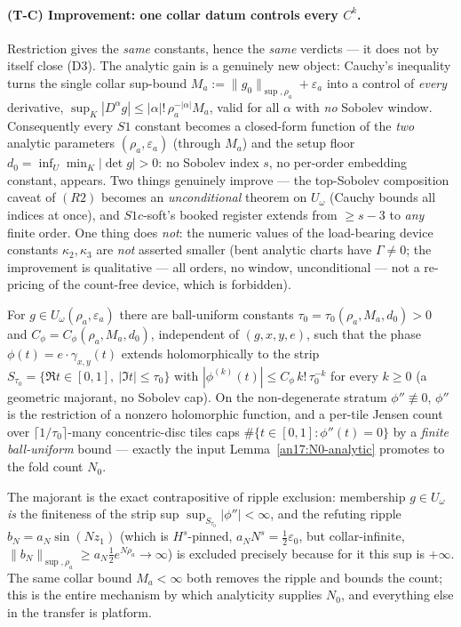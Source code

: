 \paragraph{(T-C) Improvement: one collar datum controls every $C^k$.} Restriction
gives the \emph{same} constants, hence the \emph{same} verdicts --- it does not by
itself close (D3). The analytic gain is a genuinely new object: Cauchy's
inequality turns the single collar sup-bound $M_a:=\|g_0\|_{\sup,\rho_a}+
\varepsilon_a$ into a control of \emph{every} derivative, $\sup_{K}|D^\alpha g|
\le|\alpha|!\,\rho_a^{-|\alpha|}M_a$, valid for all $\alpha$ with \emph{no}
Sobolev window. Consequently every $S1$ constant becomes a closed-form function of
the \emph{two} analytic parameters $(\rho_a,\varepsilon_a)$ (through $M_a$) and the
setup floor $d_0=\inf_U\min_K|\det g|>0$: no Sobolev index $s$, no per-order
embedding constant, appears. Two things genuinely improve --- the top-Sobolev
composition caveat of $(R2)$ becomes an \emph{unconditional} theorem on $U_\omega$
(Cauchy bounds all indices at once), and $S1c$-soft's booked register extends from
$\ge s-3$ to \emph{any} finite order. One thing does \emph{not}: the numeric
values of the load-bearing device constants $\kappa_2,\kappa_3$ are \emph{not}
asserted smaller (bent analytic charts have $\Gamma\neq0$; the improvement is
qualitative --- all orders, no window, unconditional --- not a re-pricing of the
count-free device, which is forbidden).

\begin{lemma}\label{an17:S1-majorant}
For $g\in U_\omega(\rho_a,\varepsilon_a)$ there are ball-uniform constants
$\tau_0=\tau_0(\rho_a,M_a,d_0)>0$ and $C_\phi=C_\phi(\rho_a,M_a,d_0)$,
independent of $(g,x,y,e)$, such that the phase $\phi(t)=e\cdot\gamma_{x,y}(t)$
extends holomorphically to the strip $S_{\tau_0}=\{\Re t\in[0,1],\ |\Im t|\le
\tau_0\}$ with $|\phi^{(k)}(t)|\le C_\phi\,k!\,\tau_0^{-k}$ for every $k\ge0$
\textup{(}a geometric majorant, no Sobolev cap\textup{)}. On the non-degenerate
stratum $\phi''\not\equiv0$, $\phi''$ is the restriction of a nonzero
holomorphic function, and a per-tile Jensen count over
$\lceil 1/\tau_0\rceil$-many concentric-disc tiles caps
$\#\{t\in[0,1]:\phi''(t)=0\}$ by a \emph{finite ball-uniform} bound --- exactly
the input Lemma~\ref{an17:N0-analytic} promotes to the fold count $N_0$.
\end{lemma}

The majorant is the exact contrapositive of ripple exclusion: membership
$g\in U_\omega$ \emph{is} the finiteness of the strip sup
$\sup_{S_{\tau_0}}|\phi''|<\infty$, and the refuting ripple $b_N=a_N\sin(Nz_1)$
(which is $H^s$-pinned, $a_N N^s=\tfrac12\varepsilon_0$, but collar-infinite,
$\|b_N\|_{\sup,\rho_a}\ge a_N\tfrac12 e^{N\rho_a}\to\infty$) is excluded precisely
because for it this sup is $+\infty$. The same collar bound $M_a<\infty$ both
removes the ripple and bounds the count; this is the entire mechanism by which
analyticity supplies $N_0$, and everything else in the transfer is platform.

